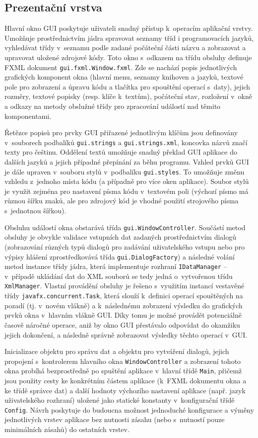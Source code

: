 \documentclass[czech,BP]{thesiskiv}
\begin{document}
\subsection{Prezentační vrstva}
Hlavní okno GUI poskytuje uživateli snadný přístup k~operacím aplikační vrstvy. Umožňuje prostřednictvím jádra spravovat seznamy tříd i programovacích jazyků, vyhledávat třídy v~seznamu podle zadané počáteční části názvu a zobrazovat a upravovat uložené zdrojové kódy. Toto okno s~odkazem na třídu obsluhy definuje FXML dokument \texttt{gui.fxml.Window.fxml}. Zde se nachází popis jednotlivých grafických komponent okna (hlavní menu, seznamy knihoven a jazyků, textové pole pro zobrazení a úpravu kódu a tlačítka pro spouštění operací s~daty), jejich rozměry, textové popisky (resp. klíče k~textům), počáteční stav, rozložení v~okně a odkazy na metody obslužné třídy pro zpracování událostí nad těmito komponentami.\par
Řetězce popisů pro prvky GUI přiřazené jednotlivým klíčům jsou definovány v~souborech podbalíků \texttt{gui.strings} a \texttt{gui.strings.xml}, koncovka názvů  značí texty pro češtinu. Oddělení textů umožňuje snadný překlad GUI aplikace do dalších jazyků a jejich případné přepínání za běhu programu. Vzhled prvků GUI je dále upraven v~souboru stylů v~podbalíku \texttt{gui.styles}. To umožňuje změnu vzhledu z~jednoho místa kódu (a případně pro více oken aplikace). Soubor stylů je využit zejména pro nastavení písma kódu v~textovém poli (výchozí písmo má různou šířku znaků, ale pro zdrojový kód je vhodné použití strojového písma s~jednotnou šířkou).\par
Obsluhu událostí okna obstarává třída \texttt{gui.WindowController}. Součástí metod obsluhy je obvykle validace vstupních dat zadaných prostřednictvím dialogů (zobrazování různých typů dialogů pro zadávání uživatelského vstupu nebo pro výpisy hlášení zprostředkovává třída \texttt{gui.DialogFactory}) a následné volání metod instance třídy jádra, která implementuje rozhraní \texttt{IDataManager} -- v~případě ukládání dat do XML souborů se tedy jedná o~vytvořenou třídu \texttt{XmlManager}. Vlastní provádění obsluhy je řešeno s~využitím instancí vestavěné třídy \texttt{javafx.concurrent.Task}, která slouží k~definici operací spouštěných na pozadí (tj. v~novém vlákně) a k~následnému zobrazení výsledku do grafických prvků okna v~hlavním vlákně GUI. Díky tomu je možné provádět potenciálně časově náročné operace, aniž by okno GUI přestávalo odpovídat do okamžiku jejich dokončení, a následně správně zobrazovat výsledky těchto operací v~GUI.\par
Inicializace objektu pro správu dat a objektu pro vytváření dialogů, jejich propojení s~kontrolerem hlavního okna \texttt{WindowController} a zobrazení tohoto okna probíhá bezprostředně po spuštění aplikace v~hlavní třídě \texttt{Main}, přičemž jsou použity cesty ke konkrétním částem aplikace (k~FXML dokumentu okna a ke třídě správce dat) a další hodnoty výchozího nastavení aplikace (např. jazyk uživatelského rozhraní) uložené jako statické konstanty v~konfigurační třídě \texttt{Config}. Návrh poskytuje do budoucna možnost jednoduché konfigurace a výměny jednotlivých vrstev aplikace bez nutnosti zásahu (nebo s~nutností pouze minimálních zásahů) do ostatních vrstev.
\end{document}
